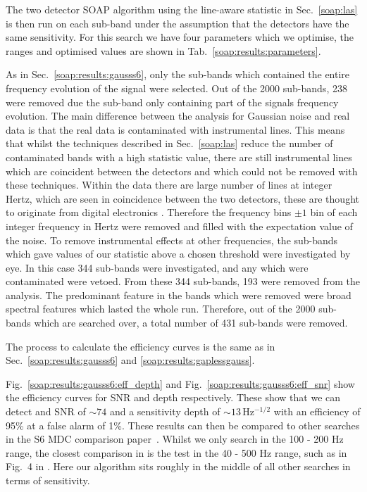 The two detector SOAP algorithm using the line-aware statistic in Sec.~\ref{soap:las} is then run on each sub-band under the assumption that the detectors have the same sensitivity.
For this search we have four parameters which we optimise, the ranges and optimised values are shown in Tab.~\ref{soap:results:parameters}.

%
%
As in Sec.~\ref{soap:results:gausss6}, only the sub-bands which contained the entire frequency evolution of the signal were selected.
Out of the 2000 sub-bands, 238 were removed due the sub-band only containing part of the signals frequency evolution.
The main difference between the analysis for Gaussian noise and real data is that
the real data is contaminated with instrumental lines. This means that whilst the techniques described in Sec.~\ref{soap:las} reduce the number of contaminated bands with a high statistic value, there are still
instrumental lines which are coincident between the detectors and which could not be removed
with these techniques. Within the data there are large number of lines at integer Hertz, which are seen in coincidence between the two detectors, these are thought to originate from digital electronics \citep{coughlin2010NoiseLine}. Therefore the frequency bins $\pm1$ bin of each integer frequency in
Hertz were removed and filled with the expectation value of the noise. To remove instrumental effects at other frequencies,
the sub-bands which gave values of our
statistic above a chosen threshold were investigated by eye. In this case 344 sub-bands were
investigated, and any which were contaminated were vetoed. 
From these 344 sub-bands, 193 were removed from the analysis. The predominant feature in the bands which were removed were broad spectral features which lasted the whole run. Therefore, out of the 2000 sub-bands which are searched over, a total number of 431 sub-bands were removed.

%
%
The process to calculate the efficiency curves is the same as
in Sec.~\ref{soap:results:gausss6} and \ref{soap:results:gaplessgauss}.

%
%

Fig.~\ref{soap:results:gausss6:eff_depth} and Fig.~\ref{soap:results:gausss6:eff_snr} show the efficiency curves
for \gls{SNR} and depth respectively.  These show that we can detect and
\gls{SNR} of $\sim 74$ and a sensitivity depth of $\sim 13$\,Hz$^{-1/2}$ with
an efficiency of 95\% at a false alarm of 1\%. These results can then be compared to other searches in the S6 MDC comparison paper~\citep{walsh2016ComparisonMethods}. Whilst we only search in the 100 - 200 Hz range, the closest comparison in \citep{walsh2016ComparisonMethods} is the test in the 40 - 500 Hz range, such as in Fig.~4 in \citep{walsh2016ComparisonMethods}. Here our algorithm sits roughly in the middle of all other searches in terms of sensitivity.

